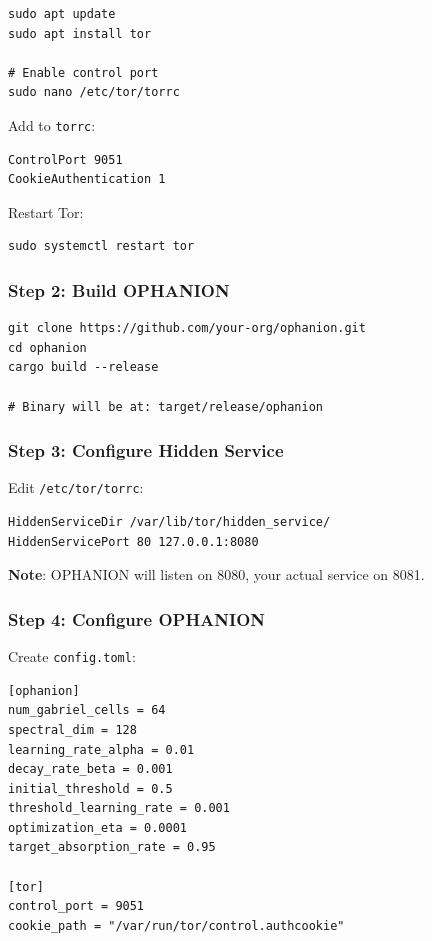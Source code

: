 \documentclass[11pt,a4paper]{article}
\begin{document}
\begin{verbatim}
sudo apt update
sudo apt install tor

# Enable control port
sudo nano /etc/tor/torrc
\end{verbatim}

Add to \texttt{torrc}:
\begin{verbatim}
ControlPort 9051
CookieAuthentication 1
\end{verbatim}

Restart Tor:
\begin{verbatim}
sudo systemctl restart tor
\end{verbatim}

\subsubsection{Step 2: Build OPHANION}

\begin{verbatim}
git clone https://github.com/your-org/ophanion.git
cd ophanion
cargo build --release

# Binary will be at: target/release/ophanion
\end{verbatim}

\subsubsection{Step 3: Configure Hidden Service}

Edit \texttt{/etc/tor/torrc}:
\begin{verbatim}
HiddenServiceDir /var/lib/tor/hidden_service/
HiddenServicePort 80 127.0.0.1:8080
\end{verbatim}

\textbf{Note}: OPHANION will listen on 8080, your actual service on 8081.

\subsubsection{Step 4: Configure OPHANION}

Create \texttt{config.toml}:
\begin{verbatim}
[ophanion]
num_gabriel_cells = 64
spectral_dim = 128
learning_rate_alpha = 0.01
decay_rate_beta = 0.001
initial_threshold = 0.5
threshold_learning_rate = 0.001
optimization_eta = 0.0001
target_absorption_rate = 0.95

[tor]
control_port = 9051
cookie_path = "/var/run/tor/control.authcookie"
\end{verbatim}
\end{document}
